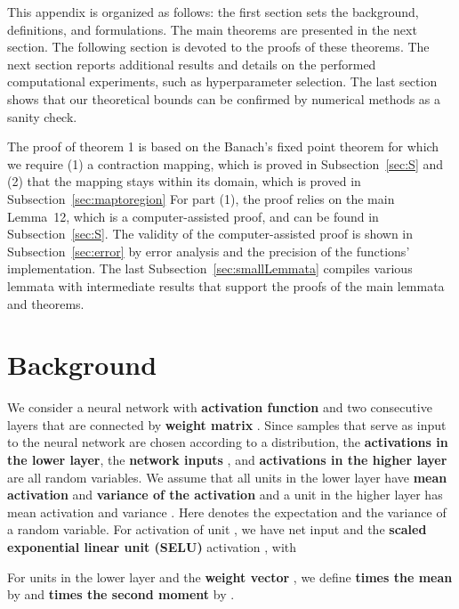 \documentclass{article}
\begin{document}
\setcounter{theorem}{0}
\tableofcontents




\vspace{1cm}
This appendix is organized as follows: the first section 
sets the background, definitions, and formulations.
The main theorems are presented in the next section.
The following section is devoted to the proofs of these theorems.
The next section reports additional results and details on the
performed computational experiments, such as hyperparameter selection. 
The last section shows that our theoretical bounds can be
confirmed by numerical methods as a sanity check.

The proof of theorem 1 is based on the Banach's fixed point theorem 
for which we require (1) a contraction mapping, which is proved in Subsection~\ref{sec:S}
and (2) that the mapping stays within its domain, which is proved in Subsection~\ref{sec:maptoregion}
For part (1), the proof relies on the main Lemma~12, which is a computer-assisted proof, and can be found 
in Subsection~\ref{sec:S}. The validity of the computer-assisted proof is shown in Subsection~\ref{sec:error} by 
error analysis and the precision of the functions' implementation. 
The last Subsection~\ref{sec:smallLemmata} compiles various lemmata with intermediate results that support 
the proofs of the main lemmata and theorems.

\section{Background}
\label{sec:fixedpointanalysis}
We consider a neural network with {\bf activation function}  and 
two consecutive layers that are connected by {\bf weight matrix} .
Since samples that serve as input to the neural network are chosen according to a distribution, 
the  {\bf activations  in the lower layer}, 
the {\bf network inputs} , and {\bf activations  in the
higher layer} are all random variables. We assume that all units  in the lower layer
have {\bf mean activation}  and {\bf variance of the
activation}
 and a unit  in the
higher layer has mean activation  and variance
. Here  denotes the expectation and
 the variance of a random variable.
For activation of unit , we have net input   and 
the {\bf scaled exponential linear unit (SELU)}
activation , with 

For  units  in the lower layer and 
the {\bf weight vector} , we define 
{\bf  times the mean} by  
and {\bf  times the second moment} by .
\end{document}
